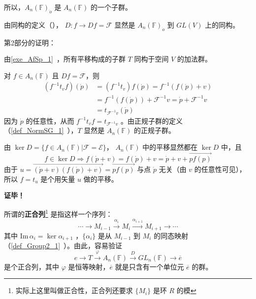 所以，$A_n(\mathbb F)_{\dot o}$ 是 $A_n(\mathbb F)$ 的一个子群。

由同构的定义（）， $D:f\rightarrow Df=\mathcal F$ 显然是 $A_n(\mathbb F)_{\dot o}$ 到 $GL(V)$ 上的同构。

第2部分的证明：

由\autoref{exe_AfSp_1}~，所有平移构成的子群 $T$ 同构于空间 $V$ 的加法群。
 
对 $f\in A_n(\mathbb F)$ 且 $Df=\mathcal F$，则
\begin{equation}
\begin{aligned}
(f^{-1}t_vf)(\dot p)&=(f^{-1}t_v)f(\dot p)=f^{-1}(f(\dot p)+v)\\
&=f^{-1}(f(\dot p))+\mathcal F^{-1}v=\dot p+\mathcal F^{-1}v\\
&=t_{\mathcal F^{-1}v}(\dot p)
\end{aligned}
\end{equation}
因为 $\dot p$ 的任意性，从而 $f^{-1}t_vf=t_{\mathcal F^{-1}v}$ 。由正规子群的定义（\autoref{def_NormSG_1}~），$T$ 显然是 $A_n(\mathbb F)$ 的正规子群。

由 $\ker D=\{f\in A_n(\mathbb F)|\mathcal F=\mathcal E\}$， $A_n(\mathbb F)$ 中的平移显然都在 $\ker D$ 中，且
\begin{equation}
f\in \ker D\Rightarrow f(\dot p+v)=f(\dot p)+v=\dot p+v+\overrightarrow{pf(p)}
\end{equation}
由于 $u=\overrightarrow{(\dot p+v)(f(\dot p)+v)}=\overrightarrow{pf(p)}$ 与点 $\dot p$ 无关（由 $v$ 的任意性可见），所以 $f=t_u$ 是个用矢量 $u$ 做的平移。

\textbf{证毕！}

所谓的\textbf{正合列}\footnote{实际上这里叫做正合性，正合列还要求 $\{M_i\}$ 是环 $R$ 的模} 是指这样一个序列：
\begin{equation}
\cdots\rightarrow M_{i-1}\xrightarrow{\alpha_i} M_{i}\xrightarrow{\alpha_{i+1}}M_{i+1}\rightarrow\cdots
\end{equation}
其中 $\mathrm{Im}\,\alpha_{i}=\ker\alpha_{i+1}$ ，$\{\alpha_i\}$ 是从 $M_{i-1}$ 到 $M_i$ 的同态映射（\autoref{def_Group2_1}~）。由此，容易验证
\begin{equation}
e\rightarrow T\xrightarrow{\varphi}A_n(\mathbb F)\xrightarrow{D} GL_n(\mathbb F)\rightarrow \overline{e}
\end{equation}
是个正合列，其中 $\varphi$ 是恒等映射，$\overline{e}$ 就是只含有一个单位元 $\overline{e}$ 的群。 